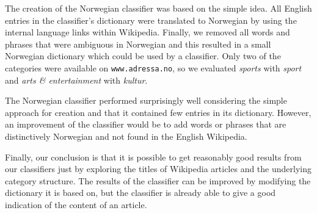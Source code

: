 The creation of the Norwegian classifier was based on the simple idea. All English entries in the classifier's dictionary were translated to Norwegian by using the internal language links within Wikipedia. Finally, we removed all words and phrases that were ambiguous in Norwegian and this resulted in a small Norwegian dictionary which could be used by a classifier. Only two of the categories were available on \texttt{www.adressa.no}, so we evaluated \emph{sports} with \emph{sport} and \emph{arts \& entertainment} with \emph{kultur}.

The Norwegian classifier performed surprisingly well considering the simple approach for creation and that it contained few entries in its dictionary. However, an improvement of the classifier would be to add words or phrases that are distinctively Norwegian and not found in the English Wikipedia. %


Finally, our conclusion is that it is possible to get reasonably good results from our classifiers just by exploring the titles of Wikipedia articles and the underlying category structure. The results of the classifier can be improved by modifying the dictionary it is based on, but the classifier is already able to give a good indication of the content of an article. 




\begin{comment}
\subsection{Summary (of essay)}
This paper has given a brief introduction to the automatic categorization problem used for content analysis. The main reason for automatic content analysis is that manual classification is impossible for large collections of text, since it is both time consuming and  depends on experts within the topic of the texts. Automatic content analysis is based on the idea that the computer understands texts by recognizing specific keywords that  connected to one or more predefined categories. The advantages of basing such a keyword list on the titles of articles from Wikipedia is that Wikipedia is a large online encyclopedia that covers lots of subjects and is regularly maintained by lots volunteers. The category set for the classification can vary depending on the purpose of the classification, but it is essential that the predefined set is large enough to cover enough topics, but also so specific that information is preserved. An example of a predefined category set that is well-suited for advertisement is provided by IAB, Interactive Advertising Bureau. 

\subsection{The final results}

\end{comment}
